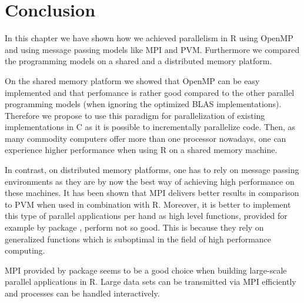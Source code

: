 

\section{Conclusion}

In this chapter we have shown how we achieved parallelism in R
using OpenMP and using message passing models like MPI and
PVM. Furthermore we compared the programming models on a shared and a
distributed memory platform.

On the shared memory platform we showed that OpenMP can be easy
implemented and that perfomance is rather good compared to the other
parallel programming models (when ignoring the optimized BLAS
implementations). Therefore we propose to use this paradigm for
parallelization of existing implementations in C as it is possible to
incrementally parallelize code. Then, as many commodity computers
offer more than one processor nowadays, one can experience higher
performance when using R on a shared memory machine.

In contrast, on distributed memory platforms, one has to rely on
message passing environments as they are by now the best way of
achieving high performance on these machines. It has been shown that
MPI delivers better results in comparison to PVM when used in
combination with R. Moreover, it is better to implement this type of
parallel applications per hand as high level functions, provided for
example by package , perform not so good. This is because
they rely on generalized functions which is suboptimal in the field of
high performance computing.

MPI provided by package  seems to be a good choice when
building large-scale parallel applications in R. Large data sets can
be transmitted via MPI efficiently and processes can be handled
interactively.


%
